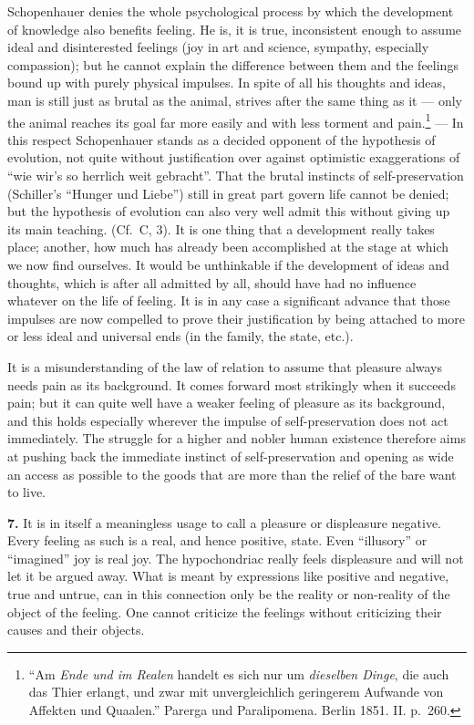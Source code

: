 \documentclass[12pt,a4paper]{book}
\newcommand{\opage}[1]{\marginnote{\footnotesize\textit{[#1]}}}
\begin{document}
Schopenhauer denies the whole psychological process by which the
development of knowledge also benefits feeling. He is, it is true,
inconsistent enough to assume ideal and disinterested feelings (joy in
art and science, sympathy, especially compassion); but he cannot explain
the difference between them and the feelings bound up with purely
physical impulses. In spite of all his thoughts and ideas, man is still
just as brutal as the animal, strives after the same thing as it ---
only the animal reaches its goal far more easily and
with less torment and pain.\footnote{``Am \emph{Ende und im Realen}
handelt es sich nur um \emph{dieselben Dinge}, die auch das Thier
erlangt, und zwar mit unvergleichlich geringerem Aufwande von Affekten
und Quaalen.'' Parerga und Paralipomena. Berlin 1851. II. p.~260.} ---
In this respect Schopenhauer stands as a decided opponent of the
hypothesis of evolution, not quite without justification over against
optimistic exaggerations of ``wie wir's so herrlich weit gebracht''.
That the brutal instincts of self-preservation (Schiller's ``Hunger und
Liebe'') still in great part govern life cannot be denied; but the
hypothesis of evolution can also very well admit this without giving up
its main teaching. (Cf.\ C, 3). It is one thing that a development
really takes place; another, how much has already been accomplished at
the stage at which we now find ourselves. It would be unthinkable if the
development of ideas and thoughts, which is after all admitted by all,
should have had no influence whatever on the life of feeling. It is in
any case a significant advance that those impulses are now compelled to
prove their justification by being attached to more or less ideal and
universal ends (in the family, the state, etc.).

It is a misunderstanding of the law of relation to assume that pleasure
always needs pain as its background. It comes forward most strikingly
when it succeeds pain; but it can quite well have a weaker feeling of
pleasure as its background, and this holds especially wherever the
impulse of self-preservation does not act immediately. The struggle for
a higher and nobler human existence therefore aims at pushing back the
immediate
\opage{339}instinct of self-preservation and opening as wide an access
as possible to the goods that are more than the relief of the bare want
to live.

\textbf{7.} It is in itself a meaningless usage to call a pleasure or
displeasure negative. Every feeling as such is a real, and hence
positive, state. Even ``illusory'' or ``imagined'' joy is real joy. The
hypochondriac really feels displeasure and will not let it be argued
away. What is meant by expressions like positive and negative, true and
untrue, can in this connection only be the reality or non-reality of
the object of the feeling. One cannot criticize the feelings without
criticizing their causes and their objects.
\end{document}
